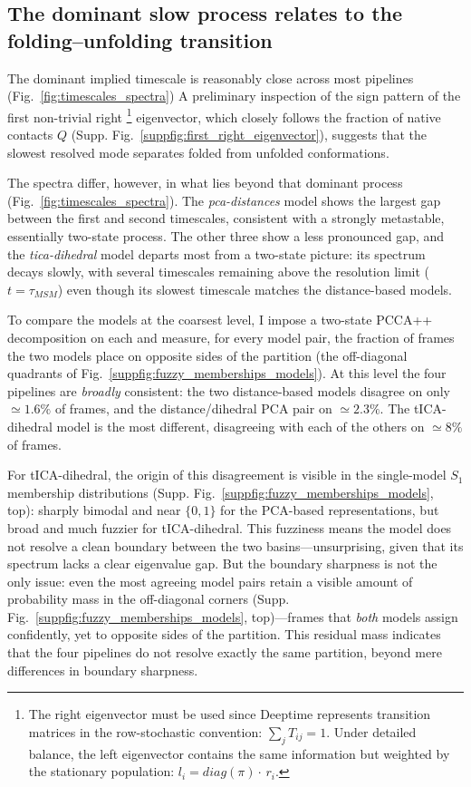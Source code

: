\documentclass[prl,twocolumn]{revtex4-1}
\begin{document}
\subsection{The dominant slow process relates to the folding--unfolding transition}
The dominant implied timescale is reasonably close across most pipelines (Fig.~\ref{fig:timescales_spectra}) %
A preliminary inspection of the sign pattern of the first non-trivial right \footnote{The right eigenvector must be used since Deeptime represents transition matrices in the row-stochastic convention: $\sum_{j}T_{ij} = 1$. Under detailed balance, the left eigenvector contains the same information but weighted by the stationary population: $l_i = diag(\pi)\cdot\, r_i$.} eigenvector, which closely follows the fraction of native contacts $Q$ (Supp. Fig.~\ref{suppfig:first_right_eigenvector}), suggests that the slowest resolved mode separates folded from unfolded conformations.

The spectra differ, however, in what lies beyond that dominant process (Fig.~\ref{fig:timescales_spectra}). The \textit{pca-distances} model shows the largest gap between the first and second timescales, consistent with a strongly metastable, essentially two-state process. The other three show a less pronounced gap, and the \textit{tica-dihedral} model departs most from a two-state picture: its spectrum decays slowly, with several timescales remaining above the resolution limit ($t = \tau_{MSM}$) even though its slowest timescale matches the distance-based models.

To compare the models at the coarsest level, I impose a two-state PCCA++ decomposition on each and measure, for every model pair, the fraction of frames the two models place on opposite sides of the partition (the off-diagonal quadrants of Fig.~\ref{suppfig:fuzzy_memberships_models}). At this level the four pipelines are \textit{broadly} consistent: the two distance-based models disagree on only $\simeq 1.6\%$ of frames, and the distance/dihedral PCA pair on $\simeq 2.3\%$. The tICA-dihedral model is the most different, disagreeing with each of the others on $\simeq 8\%$ of frames.

For tICA-dihedral, the origin of this disagreement is visible in the single-model $S_1$ membership distributions (Supp. Fig.~\ref{suppfig:fuzzy_memberships_models}, top): sharply bimodal and near $\{0,1\}$ for the PCA-based representations, but broad and much fuzzier for tICA-dihedral. This fuzziness means the model does not resolve a clean boundary between the two basins—unsurprising, given that its spectrum lacks a clear eigenvalue gap. But the boundary sharpness is not the only issue: even the most agreeing model pairs retain a visible amount of probability mass in the off-diagonal corners (Supp. Fig.~\ref{suppfig:fuzzy_memberships_models}, top)—frames that \emph{both} models assign confidently, yet to opposite sides of the partition. This residual mass indicates that the four pipelines do not resolve exactly the same partition, beyond mere differences in boundary sharpness.
\end{document}
